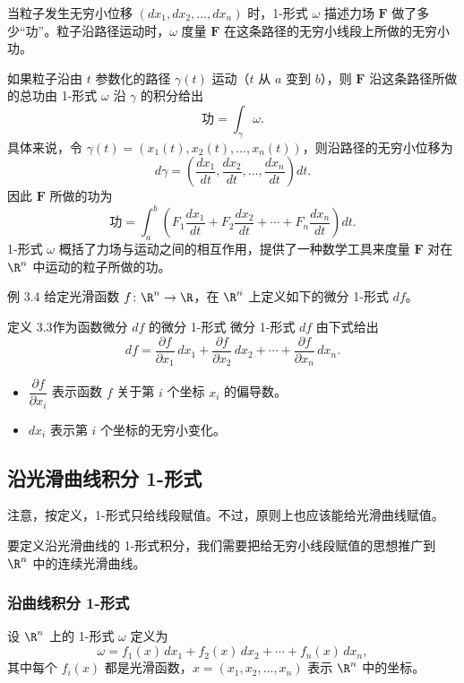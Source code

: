 当粒子发生无穷小位移 $(dx_1,dx_2,\dots,dx_n)$ 时，1-形式 $\omega$ 描述力场 $\symbf{F}$ 做了多少“功”。粒子沿路径运动时，$\omega$ 度量 $\symbf{F}$ 在这条路径的无穷小线段上所做的无穷小功。

如果粒子沿由 $t$ 参数化的路径 $\gamma(t)$ 运动（$t$ 从 $a$ 变到 $b$），则 $\symbf{F}$ 沿这条路径所做的总功由 1-形式 $\omega$ 沿 $\gamma$ 的积分给出
\[
  \text{功}=\int_\gamma\omega.
\]
具体来说，令 $\gamma(t)=(x_1(t),x_2(t),\dots,x_n(t))$，则沿路径的无穷小位移为
\[
  d\gamma=\left(\frac{dx_1}{dt},\frac{dx_2}{dt},\dots,\frac{dx_n}{dt}\right)dt.
\]
因此 $\symbf{F}$ 所做的功为
\[
  \text{功}=\int_a^b\left(F_1\frac{dx_1}{dt}+F_2\frac{dx_2}{dt}+\cdots+F_n\frac{dx_n}{dt}\right)dt.
\]
1-形式 $\omega$ 概括了力场与运动之间的相互作用，提供了一种数学工具来度量 $\symbf{F}$ 对在 $\R^n$ 中运动的粒子所做的功。

\begin{statement}{例 3.4}{}
给定光滑函数 $f\colon\R^n\to\R$，在 $\R^n$ 上定义如下的微分 1-形式 $df$。
\end{statement}

\begin{statement}{定义 3.3}{作为函数微分 $df$ 的微分 1-形式}
微分 1-形式 $df$ 由下式给出
\[
  df=\frac{\partial f}{\partial x_1}\,dx_1
     +\frac{\partial f}{\partial x_2}\,dx_2
     +\cdots+\frac{\partial f}{\partial x_n}\,dx_n.
\]
\end{statement}

\begin{itemize}
\item $\dfrac{\partial f}{\partial x_i}$ 表示函数 $f$ 关于第 $i$ 个坐标 $x_i$ 的偏导数。
\item $dx_i$ 表示第 $i$ 个坐标的无穷小变化。
\end{itemize}

\subsection{沿光滑曲线积分 1-形式}
注意，按定义，1-形式只给线段赋值。不过，原则上也应该能给光滑曲线赋值。

要定义沿光滑曲线的 1-形式积分，我们需要把给无穷小线段赋值的思想推广到 $\R^n$ 中的连续光滑曲线。

\subsubsection{沿曲线积分 1-形式}
设 $\R^n$ 上的 1-形式 $\omega$ 定义为
\[
  \omega=f_1(x)\,dx_1+f_2(x)\,dx_2+\cdots+f_n(x)\,dx_n,
\]
其中每个 $f_i(x)$ 都是光滑函数，$x=(x_1,x_2,\dots,x_n)$ 表示 $\R^n$ 中的坐标。

